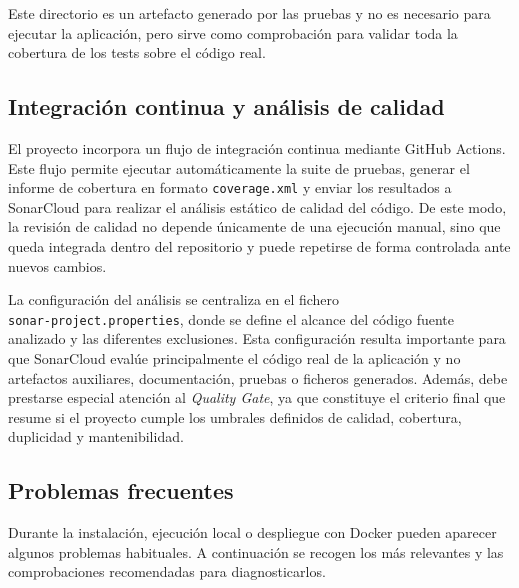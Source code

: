 Este directorio es un artefacto generado por las pruebas y no es necesario para ejecutar la aplicación, pero sirve como comprobación para validar toda la cobertura de los tests sobre el código real.

\subsection{Integración continua y análisis de calidad}

El proyecto incorpora un flujo de integración continua mediante GitHub Actions. Este flujo permite ejecutar automáticamente la suite de pruebas, generar el informe de cobertura en formato \texttt{coverage.xml} y enviar los resultados a SonarCloud para realizar el análisis estático de calidad del código. De este modo, la revisión de calidad no depende únicamente de una ejecución manual, sino que queda integrada dentro del repositorio y puede repetirse de forma controlada ante nuevos cambios.

La configuración del análisis se centraliza en el fichero \\ \texttt{sonar-project.properties}, donde se define el alcance del código fuente analizado y las diferentes exclusiones. Esta configuración resulta importante para que SonarCloud evalúe principalmente el código real de la aplicación y no artefactos auxiliares, documentación, pruebas o ficheros generados. Además, debe prestarse especial atención al \textit{Quality Gate}, ya que constituye el criterio final que resume si el proyecto cumple los umbrales definidos de calidad, cobertura, duplicidad y mantenibilidad.

\subsection{Problemas frecuentes}

Durante la instalación, ejecución local o despliegue con Docker pueden aparecer algunos problemas habituales. A continuación se recogen los más relevantes y las comprobaciones recomendadas para diagnosticarlos.

